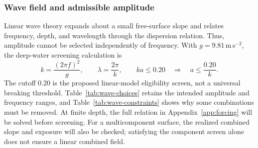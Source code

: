 \documentclass[10pt,letterpaper]{article}
\begin{document}
\subsubsection{Wave field and admissible amplitude}

Linear wave theory expands about a small free-surface slope and relates frequency, depth, and wavelength through the dispersion relation. \cite{MITOCW2005LinearWaves} Thus, amplitude cannot be selected independently of frequency. With $g=9.81\,\mathrm{m\,s^{-2}}$, the deep-water screening calculation is
\begin{equation}
\label{eq:wave-screen}
k=\frac{(2\pi f)^2}{g},\qquad
\lambda=\frac{2\pi}{k},\qquad
ka\leq0.20\quad\Longrightarrow\quad a\leq\frac{0.20}{k}.
\end{equation}
The cutoff $0.20$ is the proposed linear-model eligibility screen, not a universal breaking threshold. Table~\ref{tab:wave-choices} retains the intended amplitude and frequency ranges, and Table~\ref{tab:wave-constraints} shows why some combinations must be removed. At finite depth, the full relation in Appendix~\ref{app:forcing} will be solved before screening. For a multicomponent surface, the realized combined slope and exposure will also be checked; satisfying the component screen alone does not ensure a linear combined field.
\end{document}

